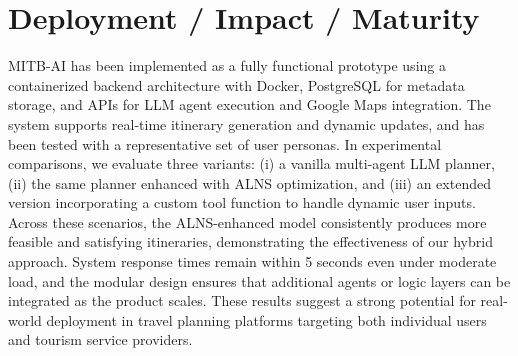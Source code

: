 \documentclass{ecai}
\begin{document}
\section{Deployment / Impact / Maturity}
MITB-AI has been implemented as a fully functional prototype using a containerized backend architecture with Docker, PostgreSQL for metadata storage, and APIs for LLM agent execution and Google Maps integration. The system supports real-time itinerary generation and dynamic updates, and has been tested with a representative set of user personas. In experimental comparisons, we evaluate three variants: (i) a vanilla multi-agent LLM planner, (ii) the same planner enhanced with ALNS optimization, and (iii) an extended version incorporating a custom tool function to handle dynamic user inputs. Across these scenarios, the ALNS-enhanced model consistently produces more feasible and satisfying itineraries, demonstrating the effectiveness of our hybrid approach. System response times remain within 5 seconds even under moderate load, and the modular design ensures that additional agents or logic layers can be integrated as the product scales. These results suggest a strong potential for real-world deployment in travel planning platforms targeting both individual users and tourism service providers. 
\vspace{-0.1cm}
\end{document}
